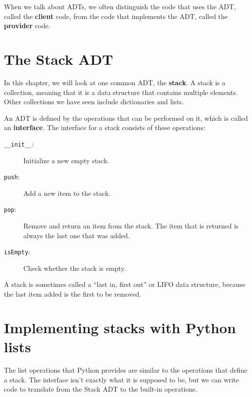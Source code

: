 When we talk about ADTs, we often distinguish the code that uses
the ADT, called the {\bf client} code, from the code that implements
the ADT, called the {\bf provider} code.



\section{The Stack ADT}

In this chapter, we will look at one common ADT, the {\bf stack}.  A
stack is a collection, meaning that it is a data structure that
contains multiple elements.  Other collections we have seen include
dictionaries and lists.


An ADT is defined by the operations that can be performed on it, which
is called an {\bf interface}.  The interface for a stack consists of
these operations:

\begin{description}

\item[{\tt \_\_init\_\_}:] Initialize a new empty stack.

\item[{\tt push}:] Add a new item to the stack.

\item[{\tt pop}:] Remove and return an item from the stack.  The item
that is returned is always the last one that was added.

\item[{\tt isEmpty}:] Check whether the stack is empty.

\end{description}

A stack is sometimes called a ``last in, first out'' or LIFO
data structure, because the last item added is the first to
be removed.


\section {Implementing stacks with Python lists}

The list
operations that Python provides are similar to the operations that
define a stack.  The interface isn't exactly what it is supposed
to be, but we can write code to translate from the Stack ADT
to the built-in operations.

